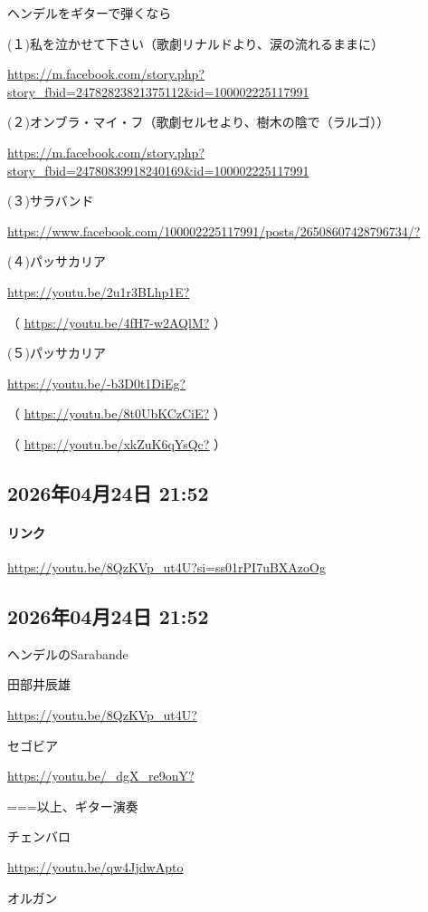 ヘンデルをギターで弾くなら

(１)私を泣かせて下さい（歌劇リナルドより、涙の流れるままに）

\url{https://m.facebook.com/story.php?story_fbid=24782823821375112&id=100002225117991}

(２)オンブラ・マイ・フ（歌劇セルセより、樹木の陰で（ラルゴ））

\url{https://m.facebook.com/story.php?story_fbid=24780839918240169&id=100002225117991}

(３)サラバンド

\url{https://www.facebook.com/100002225117991/posts/26508607428796734/?}

(４)パッサカリア

\url{https://youtu.be/2u1r3BLhp1E?}

（ \url{https://youtu.be/4fH7-w2AQlM?} ）

(５)パッサカリア

\url{https://youtu.be/-b3D0t1DiEg?}

（ \url{https://youtu.be/8t0UbKCzCiE?} ）

（ \url{https://youtu.be/xkZuK6qYsQc?} ）

\subsection*{2026年04月24日 21:52}

\paragraph{リンク}
\url{https://youtu.be/8QzKVp_ut4U?si=ss01rPI7uBXAzoOg}

\subsection*{2026年04月24日 21:52}

ヘンデルのSarabande

田部井辰雄

\url{https://youtu.be/8QzKVp_ut4U?}

セゴビア

\url{https://youtu.be/_dgX_re9onY?}

===以上、ギター演奏

チェンバロ

\url{https://youtu.be/qw4JjdwApto}

オルガン

